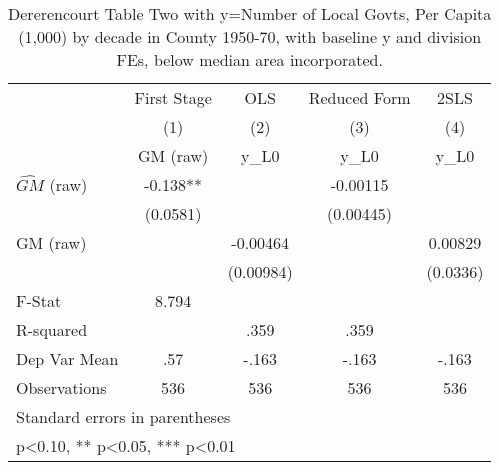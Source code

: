 \begin{table}[htbp]\centering
\def\sym#1{\ifmmode^{#1}\else\(^{#1}\)\fi}
\caption{Dererencourt Table Two with y=Number of Local Govts, Per Capita (1,000) by decade in County 1950-70, with baseline y and division FEs, below median area incorporated.}
\begin{tabular}{l*{4}{c}}
\toprule
                    & First Stage   &         OLS   &Reduced Form   &        2SLS   \\
                    &\multicolumn{1}{c}{(1)}&\multicolumn{1}{c}{(2)}&\multicolumn{1}{c}{(3)}&\multicolumn{1}{c}{(4)}\\
                    &\multicolumn{1}{c}{GM  (raw)}&\multicolumn{1}{c}{y\_L0}&\multicolumn{1}{c}{y\_L0}&\multicolumn{1}{c}{y\_L0}\\
\midrule
$\hat{GM}$ (raw)    &      -0.138** &               &    -0.00115   &               \\
                    &    (0.0581)   &               &   (0.00445)   &               \\
\addlinespace
GM  (raw)           &               &    -0.00464   &               &     0.00829   \\
                    &               &   (0.00984)   &               &    (0.0336)   \\
\midrule
F-Stat              &       8.794   &               &               &               \\
R-squared           &               &        .359   &        .359   &               \\
Dep Var Mean        &         .57   &       -.163   &       -.163   &       -.163   \\
Observations        &         536   &         536   &         536   &         536   \\
\bottomrule
\multicolumn{5}{l}{\footnotesize Standard errors in parentheses}\\
\multicolumn{5}{l}{\footnotesize * p<0.10, ** p<0.05, *** p<0.01}\\
\end{tabular}
\end{table}
